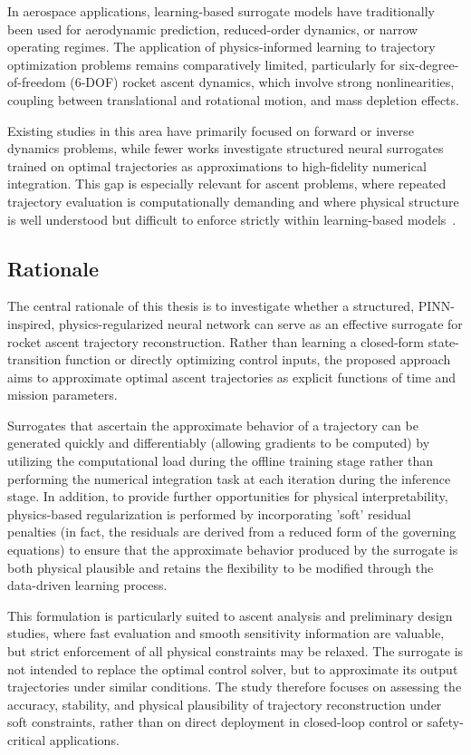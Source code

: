 In aerospace applications, learning-based surrogate models have traditionally been used for 
aerodynamic prediction, reduced-order dynamics, or narrow operating regimes. The application 
of physics-informed learning to trajectory optimization problems remains comparatively limited, 
particularly for six-degree-of-freedom (6-DOF) rocket ascent dynamics, which involve strong 
nonlinearities, coupling between translational and rotational motion, and mass depletion 
effects.

Existing studies in this area have primarily focused on forward or inverse dynamics problems, while 
fewer works investigate structured neural surrogates trained on optimal trajectories as approximations 
to high-fidelity numerical integration. This gap is especially relevant for ascent problems, where repeated 
trajectory evaluation is computationally demanding and where physical structure is well understood but 
difficult to enforce strictly within learning-based models~\cite{raissi2019,wang2022}.

\subsection{Rationale}

The central rationale of this thesis is to investigate whether a structured, PINN-inspired, 
physics-regularized neural network can serve as an effective surrogate for rocket ascent 
trajectory reconstruction. Rather than learning a closed-form state-transition function or 
directly optimizing control inputs, the proposed approach aims to approximate optimal ascent 
trajectories as explicit functions of time and mission parameters.

Surrogates that ascertain the approximate behavior of a trajectory can be generated quickly and 
differentiably (allowing gradients to be computed) by utilizing the computational load during the 
offline training stage rather than performing the numerical integration task at each iteration during 
the inference stage. In addition, to provide further opportunities for physical interpretability, 
physics-based regularization is performed by incorporating 'soft' residual penalties (in fact, the 
residuals are derived from a reduced form of the governing equations) to ensure that the approximate behavior 
produced by the surrogate is both physical plausible and retains the flexibility to be modified through 
the data-driven learning process.

This formulation is particularly suited to ascent analysis and preliminary design studies, 
where fast evaluation and smooth sensitivity information are valuable, but strict enforcement 
of all physical constraints may be relaxed. The surrogate is not intended to replace the 
optimal control solver, but to approximate its output trajectories under similar conditions. 
The study therefore focuses on assessing the accuracy, stability, and physical plausibility of 
trajectory reconstruction under soft constraints, rather than on direct deployment in 
closed-loop control or safety-critical applications.

